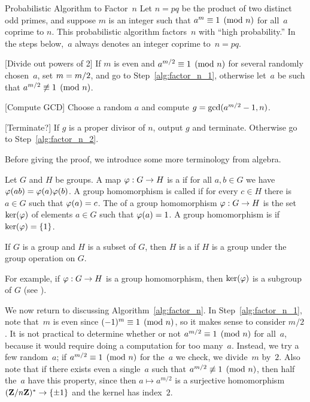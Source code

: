 \begin{algorithm}{Probabilistic Algorithm to Factor~$n$}\label{alg:factor_n}
  Let $n=pq$ be the product of two distinct odd primes, and suppose
  $m$ is an integer such that $a^m\equiv 1\pmod{n}$ for all~$a$ coprime
  to $n$.  This probabilistic algorithm factors~$n$ with ``high
  probability.''  In the steps below,~$a$ always denotes an integer
  coprime to~$n=pq$.
\begin{steps}
\item{}[Divide out powers of 2]
\label{alg:factor_n_1} If $m$ is even and $a^{m/2}\equiv 1\pmod{n}$ for several
randomly chosen~$a$, set $m= m/2$, and go to
Step~\ref{alg:factor_n_1}, otherwise let~$a$ be such that
$a^{m/2}\not \equiv 1\pmod{n}$.
\item{}\label{alg:factor_n_2}
 [Compute GCD]
Choose a random $a$ and compute $g= \gcd(a^{m/2}-1,n)$.
\item{} [Terminate?] If $g$ is a proper divisor of $n$, output $g$
and terminate.  Otherwise go to Step~\ref{alg:factor_n_2}.
\end{steps}
\end{algorithm}

Before giving the proof, we introduce some more terminology
from algebra.
\begin{definition}\label{defn:hom}
Let $G$ and $H$ be groups.  A map $\varphi:G \to H$
is a  if for all $a,b\in G$
we have $\varphi(ab) = \varphi(a) \varphi(b)$.
A group homomorphism is called  if
for every $c\in H$ there is $a\in G$ such that $\varphi(a) = c$.
The  of a group homomorphism $\varphi:G\to H$
is the set $\ker(\varphi)$ of elements $a\in G$ such that $\varphi(a) = 1$.
A group homomorphism is  if $\ker(\varphi) = \{1\}$.
\end{definition}

\begin{definition}[Subgroup]
  If $G$ is a group and $H$ is a subset of $G$, then $H$ is a
   if $H$ is a group under the group operation on $G$.
\end{definition}
For example, if $\varphi:G\to H$ is a group homomorphism, then $\ker(\varphi)$
is a subgroup of $G$ (see ).


We now return to discussing Algorithm~\ref{alg:factor_n}.
In Step~\ref{alg:factor_n_1}, note that~$m$ is even since $(-1)^m\equiv
1\pmod{n}$, so it makes sense to consider $m/2$.  It is not practical
to determine whether or not $a^{m/2}\equiv 1\pmod{n}$ for all~$a$,
because it would require doing a computation for too many~$a$.
Instead, we try a few random~$a$; if $a^{m/2}\equiv 1\pmod{n}$ for
the~$a$ we check, we divide~$m$ by~$2$.  Also note that if there
exists even a single~$a$ such that $a^{m/2}\not\equiv 1\pmod{n}$, then
half the~$a$ have this property, since then $a\mapsto a^{m/2}$ is
a surjective homomorphism $(\mathbf{Z}/n\mathbf{Z}{})^*\rightarrow \{\pm 1\}$ and the kernel
has index~$2$.

